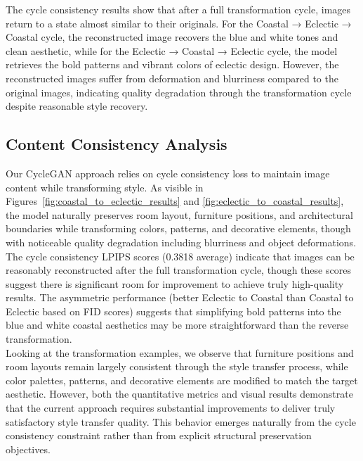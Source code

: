 \documentclass[twocolumn,superscriptaddress,aps]{revtex4-1}
\begin{document}
The cycle consistency results show that after a full transformation cycle, images return to a state almost similar to their originals. For the Coastal → Eclectic → Coastal cycle, the reconstructed image recovers the blue and white tones and clean aesthetic, while for the Eclectic → Coastal → Eclectic cycle, the model retrieves the bold patterns and vibrant colors of eclectic design. However, the reconstructed images suffer from deformation and blurriness compared to the original images, indicating quality degradation through the transformation cycle despite reasonable style recovery.

\subsection{Content Consistency Analysis}

Our CycleGAN approach relies on cycle consistency loss to maintain image content while transforming style. As visible in Figures~\ref{fig:coastal_to_eclectic_results} and \ref{fig:eclectic_to_coastal_results}, the model naturally preserves room layout, furniture positions, and architectural boundaries while transforming colors, patterns, and decorative elements, though with noticeable quality degradation including blurriness and object deformations. \\

The cycle consistency LPIPS scores (0.3818 average) indicate that images can be reasonably reconstructed after the full transformation cycle, though these scores suggest there is significant room for improvement to achieve truly high-quality results. The asymmetric performance (better Eclectic to Coastal than Coastal to Eclectic based on FID scores) suggests that simplifying bold patterns into the blue and white coastal aesthetics may be more straightforward than the reverse transformation. \\

Looking at the transformation examples, we observe that furniture positions and room layouts remain largely consistent through the style transfer process, while color palettes, patterns, and decorative elements are modified to match the target aesthetic. However, both the quantitative metrics and visual results demonstrate that the current approach requires substantial improvements to deliver truly satisfactory style transfer quality. This behavior emerges naturally from the cycle consistency constraint rather than from explicit structural preservation objectives.
\end{document}

